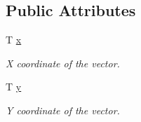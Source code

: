 \subsection*{Public Attributes}
\begin{DoxyCompactItemize}
\item 
T \hyperlink{classsf_1_1_vector2_a1e6ad77fa155f3753bfb92699bd28141}{x}
\begin{DoxyCompactList}\small\item\em X coordinate of the vector. \end{DoxyCompactList}\item 
T \hyperlink{classsf_1_1_vector2_a420f2481b015f4eb929c75f2af564299}{y}
\begin{DoxyCompactList}\small\item\em Y coordinate of the vector. \end{DoxyCompactList}\end{DoxyCompactItemize}
